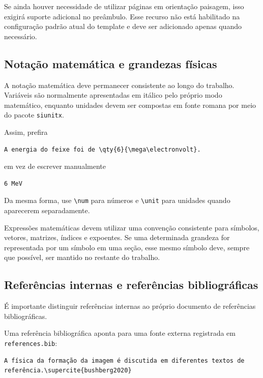 Se ainda houver necessidade de utilizar páginas em orientação paisagem, isso exigirá suporte adicional no preâmbulo. Esse recurso não está habilitado na configuração padrão atual do template e deve ser adicionado apenas quando necessário.

\subsection{Notação matemática e grandezas físicas}
\label{ssec:notacao_matematica}

A notação matemática deve permanecer consistente ao longo do trabalho.  Variáveis são normalmente apresentadas em itálico pelo próprio modo matemático, enquanto unidades devem ser compostas em fonte romana por meio do pacote \verb|siunitx|.

Assim, prefira

\begin{verbatim}
A energia do feixe foi de \qty{6}{\mega\electronvolt}.
\end{verbatim}

em vez de escrever manualmente

\begin{verbatim}
6 MeV
\end{verbatim}

Da mesma forma, use \verb|\num| para números e \verb|\unit| para unidades quando aparecerem separadamente.

Expressões matemáticas devem utilizar uma convenção consistente para símbolos, vetores, matrizes, índices e expoentes. Se uma determinada grandeza for representada por um símbolo em uma seção, esse mesmo símbolo deve, sempre que possível, ser mantido no restante do trabalho.

\subsection{Referências internas e referências bibliográficas}
\label{ssec:referencias_internas_bibliograficas}

É importante distinguir referências internas ao próprio documento de referências bibliográficas.

Uma referência bibliográfica aponta para uma fonte externa registrada em \verb|references.bib|:

\begin{verbatim}
A física da formação da imagem é discutida em diferentes textos de
referência.\supercite{bushberg2020}
\end{verbatim}

